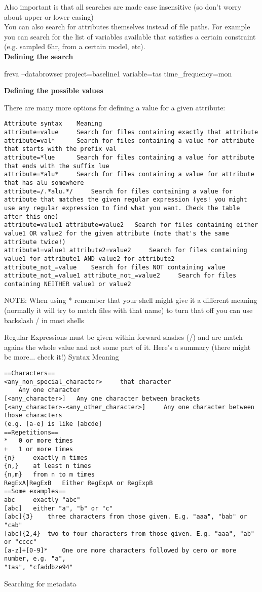 \documentclass[a4paper,11pt]{ltxdoc}
\begin{document}
Also important is that all searches are made case insensitive (so don't worry about upper or lower casing)\\

You can also search for attributes themselves instead of file paths. For example you can search for the list of variables available that satisfies a certain constraint (e.g. sampled 6hr, from a certain model, etc). \\

\textbf{Defining the search}

freva --databrowser project=baseline1 variable=tas time\_frequency=mon

\textbf{Defining the possible values}

There are many more options for defining a value for a given attribute:
\begin{lstlisting}
Attribute syntax 	Meaning
attribute=value 	Search for files containing exactly that attribute
attribute=val* 		Search for files containing a value for attribute that starts with the prefix val
attribute=*lue 		Search for files containing a value for attribute that ends with the suffix lue
attribute=*alu* 	Search for files containing a value for attribute that has alu somewhere
attribute=/.*alu.*/ 	Search for files containing a value for attribute that matches the given regular expression (yes! you might use any regular expression to find what you want. Check the table after this one)
attribute=value1 attribute=value2 	Search for files containing either value1 OR value2 for the given attribute (note that's the same attribute twice!)
attribute1=value1 attribute2=value2 	Search for files containing value1 for attribute1 AND value2 for attribute2
attribute_not_=value 	Search for files NOT containing value
attribute_not_=value1 attribute_not_=value2 	Search for files containing NEITHER value1 or value2
\end{lstlisting}
NOTE: When using * remember that your shell might give it a different meaning (normally it will try to match files with that name) to turn that off you can use backslash / in most shells

Regular Expressions must be given within forward slashes (/) and are match agains the whole value and not some part of it. Here's a summary (there might be more... check it!)
Syntax 	Meaning
\begin{lstlisting}
==Characters==
<any_non_special_character> 	that character
	Any one character
[<any_character>] 	Any one character between brackets
[<any_character>-<any_other_character>] 	Any one character between those characters 
(e.g. [a-e] is like [abcde]
==Repetitions==
* 	0 or more times
+ 	1 or more times
{n} 	exactly n times
{n,} 	at least n times
{n,m} 	from n to m times
RegExA|RegExB 	Either RegExpA or RegExpB
==Some examples==
abc 	exactly "abc"
[abc] 	either "a", "b" or "c"
[abc]{3} 	three characters from those given. E.g. "aaa", "bab" or "cab"
[abc]{2,4} 	two to four characters from those given. E.g. "aaa", "ab" or "cccc"
[a-z]+[0-9]* 	One ore more characters followed by cero or more number, e.g. "a", 
"tas", "cfaddbze94"
\end{lstlisting}
Searching for metadata
\end{document}
